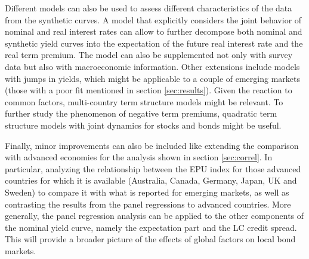 Different models can also be used to assess different characteristics of the data from the synthetic curves. A model that explicitly considers the joint behavior of nominal and real interest rates can allow to further decompose both nominal and synthetic yield curves into the expectation of the future real interest rate and the real term premium. The model can also be supplemented not only with survey data but also with macroeconomic information. Other extensions include models with jumps in yields, which might be applicable to a couple of emerging markets (those with a poor fit mentioned in section \ref{sec:results}). Given the reaction to common factors, multi-country term structure models might be relevant. To further study the phenomenon of negative term premiums, quadratic term structure models with joint dynamics for stocks and bonds might be useful.

Finally, minor improvements can also be included like extending the comparison with advanced economies for the analysis shown in section \ref{sec:correl}. In particular, analyzing the relationship between the EPU index for those advanced countries for which it is available (Australia, Canada, Germany, Japan, UK and Sweden) to compare it with what is reported for emerging markets, as well as contrasting the results from the panel regressions to advanced countries. More generally, the panel regression analysis can be applied to the other components of the nominal yield curve, namely the expectation part and the LC credit spread. This will provide a broader picture of the effects of global factors on local bond markets.
